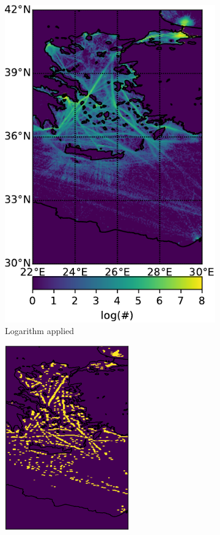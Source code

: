 \documentclass{article}
\begin{document}
\begin{figure}[h] 
  \begin{subfigure}[b]{0.49\linewidth}
    \centering
    \includegraphics[width=0.7\linewidth]{AGEAN_DCRON-crop.pdf} 
    \caption{Logarithm applied} 
    \label{fig7:a} 
    \vspace{4ex}
  \end{subfigure}%
  \begin{subfigure}[b]{0.49\linewidth}
    \centering
    \includegraphics[width=0.59\textwidth]{AGEAN_DCRON_opened-crop.pdf} 

\end{subfigure}
\end{figure}
\end{document}

